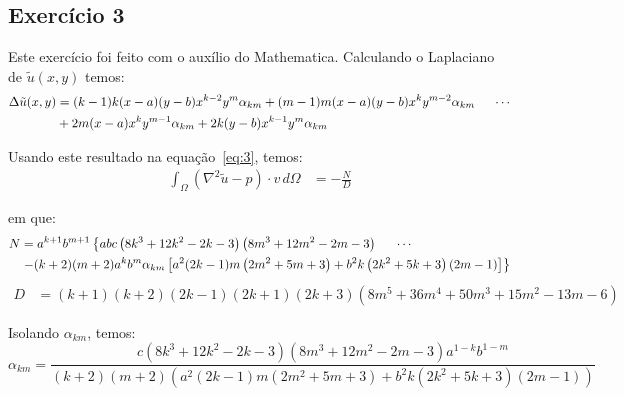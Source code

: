 \documentclass[10pt,a4paper]{article}
\begin{document}
	\subsection{Exercício 3}
	Este exercício foi feito com o auxílio do Mathematica.
	Calculando o Laplaciano de $\tilde{u}(x,y)$ temos:
	\begin{align*}
		\Delta \tilde{u}(x,y) &= (k-1) k (x-a) (y-b) x^{k-2} y^m \alpha_{km}+(m-1) m (x-a) (y-b) x^k y^{m-2} \alpha_{km} \hspace{0.5cm}\cdots\\
		& +2 m (x-a) x^k y^{m-1} \alpha_{km}+2 k (y-b) x^{k-1} y^m \alpha_{km}\\
	\end{align*}
	
	Usando este resultado na equação~\ref{eq:3}, temos:
	\begin{align*}
		\int_\Omega \left(\nabla^2\tilde{u}-p\right)\cdot v\,d\Omega &= -\frac{N}{D}
	\end{align*}
	
	em que:
	\begin{align*}
		N &= a^{k+1} b^{m+1} \left\{a b c \left(8 k^3+12 k^2-2 k-3\right) \left(8 m^3+12 m^2-2 m-3\right)\right.\hspace{0.5cm}\cdots\\
		& \left.-(k+2) (m+2) a^k b^m \alpha_{km} \left[a^2 (2 k-1) m \left(2 m^2+5 m+3\right)+b^2 k \left(2 k^2+5 k+3\right) (2 m-1)\right]\right\}
	\end{align*}
	\begin{align*}
		D &= (k+1) (k+2) (2 k-1) (2 k+1) (2 k+3) \left(8 m^5+36 m^4+50 m^3+15 m^2-13 m-6\right)
	\end{align*}
	
	Isolando $\alpha_{km}$, temos:
	\[\alpha_{km}  = \frac{c \left(8 k^3+12 k^2-2 k-3\right) \left(8 m^3+12 m^2-2 m-3\right) a^{1-k} b^{1-m}}{(k+2) (m+2) \left(a^2 (2 k-1) m \left(2 m^2+5 m+3\right)+b^2 k \left(2 k^2+5 k+3\right) (2 m-1)\right)}\]	
\end{document}
